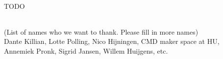 \documentclass{report}
\begin{document}
 \\

TODO

\clearpage
\begin{figure}
    \centering
\end{figure}
\clearpage

 \\

(List of names who we want to thank. Please fill in more names)\\

Dante Killian, Lotte Polling, Nico Hijningen, CMD maker space at HU, Annemiek Pronk, Sigrid Jansen, Willem Huijgens, etc.
\end{document}
